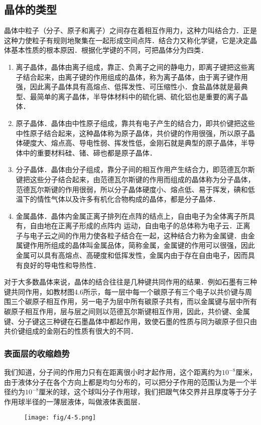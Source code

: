 \subsection{晶体的类型}

晶体中粒子（分子、原子和离子）之间存在着相互作用力，这种力叫结合力．正是这种力使粒子有规则地聚集在一起形成空间点阵．结合力又称化学键，它是决定晶体基本性质的根本原因．根据化学键的不同，可把晶体分为四类．
\begin{enumerate}
\item 离子晶体，晶体由离子组成，靠正、负离子之间的静电力，即离子键把这些离子结合起来，由离子键的作用组成的晶体，称为离子晶体，由于离子键作用强，因此离子晶体具有高熔点、低挥发性、可压缩性小．食盐晶体就是最典型、最简单的离子晶体，半导体材料中的硫化镉、硫化铝也是重要的离子晶体．
\item 原子晶体．晶体由中性原子组成，靠共有电子产生的结合力，即共价键把这些中性原子结合起来，这种晶体称为原子晶体，共价键的作用很强，所以原子晶体硬度大、熔点高、导电性弱、挥发性低，金刚石就是典型的原子晶体，半导体中的重要材料硅、锗、碲也都是原子晶体．
\item 分子晶体．晶体由分子组成，靠分子间的相互作用产生结合力，即范德瓦尔斯键把这些分子结合起来，由范德瓦尔斯键的作用而组成的晶体称为分子晶体，范德瓦尔斯键的作用很弱，所以分子晶体硬度小、熔点低、易于挥发，碘和低温下的情性气体以及许多有机化合物构成的晶体，都是分子晶体．
\item 金属晶体．晶体内金属正离子排列在点阵的结点上，自由电子为全体离子所具有，自由地在正离子形成的点阵内
运动，自由电子的总体称为电子云．正离子与电子云之间的作用力使各粒子结合在一起，这种结合力称为金属键．由金属键作用所组成的晶体叫金属品体，简称金属，金属键的作用可以很强，因此金属可以具有高熔点、高硬度和低挥发性，金属内由于存在自由电子，因而具有良好的导电性和导热性．
\end{enumerate}

对于大多数晶体来说，晶体的结合往往是几种键共同作用的结果．例如石墨有三种键共同作用，如教材图4.6所示，每一层中每一个碳原子有三个电子以共价键与周围三个碳原子相互作用，另一电子为层中所有碳原子共有，而以金属键与层中所有碳原子相互作用，层与层之间则以范德瓦尔斯键相互作用，因此，共价键、金属键、分子键这三种键在石墨晶体中都起作用，致使石墨的性质与同为碳原子但只由共价键组成的金刚石的性质有很大的不同．

\subsubsection{表面层的收缩趋势}
我们知道，分子间的作用力只有在距离很小时才起作用，这个距离约为$10^{-8}$厘米，由于液体分子在各个方向上都是均匀分布的，可以把分子作用的范围认为是一个半径约为$10^{-8}$厘米的球，这个球叫分子作用球，我们把跟气体交界并且厚度等于分子作用球半径的一薄层液体，叫做液体表面层．
\begin{figure}[htp]
    \centering
\texttt{[image: fig/4-5.png]}
    \caption{}
\end{figure}

